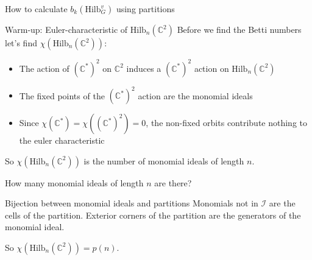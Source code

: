 \documentclass{beamer}
\newcommand{\Hilb}{\textrm{Hilb}}
\newcommand{\C}{\mathbb{C}}
\begin{document}
\begin{frame}[plain,c]

\begin{center}

\Huge

How to calculate $b_k(\Hilb^v_G)$ using partitions

\end{center}

\end{frame}


\begin{frame}{Warm-up: Euler-characteristic of $\Hilb_n(\C^2)$}
Before we find the Betti numbers let's find $\chi(\Hilb_n(\C^2))$:  

\begin{itemize}
\item The action of $(\C^*)^2$ on $\C^2$ induces a $(\C^*)^2$ action on $\Hilb_n(\C^2)$
\item The fixed points of the $(\C^*)^2$ action are the monomial ideals 
\item Since $\chi(\C^*)=\chi((\C^*)^2)=0$, the non-fixed orbits contribute nothing to the euler characteristic
\end{itemize}
So $\chi(\Hilb_n(\C^2))$ is the number of monomial ideals of length $n$.

\begin{block}{How many monomial ideals of length $n$ are there?}\end{block}



\end{frame}






\begin{frame}{Bijection between monomial ideals and partitions}
Monomials not in $\mathcal{I}$ are the cells of the partition.
Exterior corners of the partition are the generators of the monomial ideal.

\begin{center}


\end{center}
So $\chi(\Hilb_n(\C^2))=p(n)$.
\end{frame}
\end{document}
